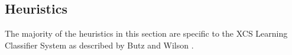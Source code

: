 \subsection{Heuristics}
The majority of the heuristics in this section are specific to the XCS Learning Classifier System as described by Butz and Wilson \cite{Butz2002a}.

